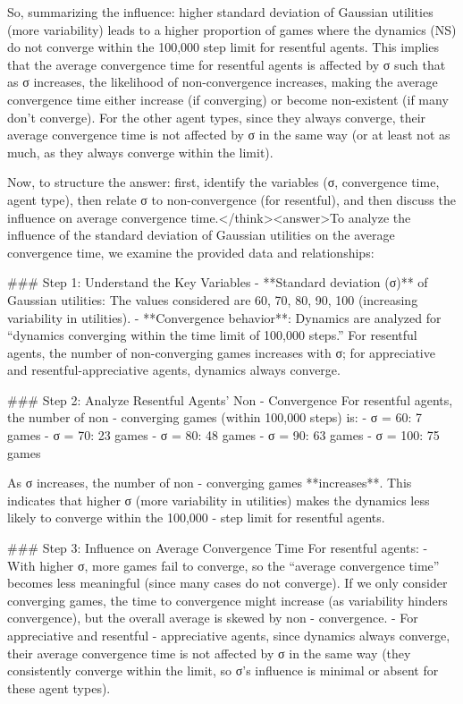 So, summarizing the influence: higher standard deviation of Gaussian utilities (more variability) leads to a higher proportion of games where the dynamics (NS) do not converge within the 100,000 step limit for resentful agents. This implies that the average convergence time for resentful agents is affected by σ such that as σ increases, the likelihood of non-convergence increases, making the average convergence time either increase (if converging) or become non-existent (if many don't converge). For the other agent types, since they always converge, their average convergence time is not affected by σ in the same way (or at least not as much, as they always converge within the limit).

Now, to structure the answer: first, identify the variables (σ, convergence time, agent type), then relate σ to non-convergence (for resentful), and then discuss the influence on average convergence time.</think><answer>To analyze the influence of the standard deviation of Gaussian utilities on the average convergence time, we examine the provided data and relationships:  


### Step 1: Understand the Key Variables  
- **Standard deviation (σ)** of Gaussian utilities: The values considered are 60, 70, 80, 90, 100 (increasing variability in utilities).  
- **Convergence behavior**: Dynamics are analyzed for “dynamics converging within the time limit of 100,000 steps.” For resentful agents, the number of non-converging games increases with σ; for appreciative and resentful-appreciative agents, dynamics always converge.  


### Step 2: Analyze Resentful Agents’ Non - Convergence  
For resentful agents, the number of non - converging games (within 100,000 steps) is:  
- σ = 60: 7 games  
- σ = 70: 23 games  
- σ = 80: 48 games  
- σ = 90: 63 games  
- σ = 100: 75 games  

As σ increases, the number of non - converging games **increases**. This indicates that higher σ (more variability in utilities) makes the dynamics less likely to converge within the 100,000 - step limit for resentful agents.  


### Step 3: Influence on Average Convergence Time  
For resentful agents:  
- With higher σ, more games fail to converge, so the “average convergence time” becomes less meaningful (since many cases do not converge). If we only consider converging games, the time to convergence might increase (as variability hinders convergence), but the overall average is skewed by non - convergence.  
- For appreciative and resentful - appreciative agents, since dynamics always converge, their average convergence time is not affected by σ in the same way (they consistently converge within the limit, so σ’s influence is minimal or absent for these agent types).  


